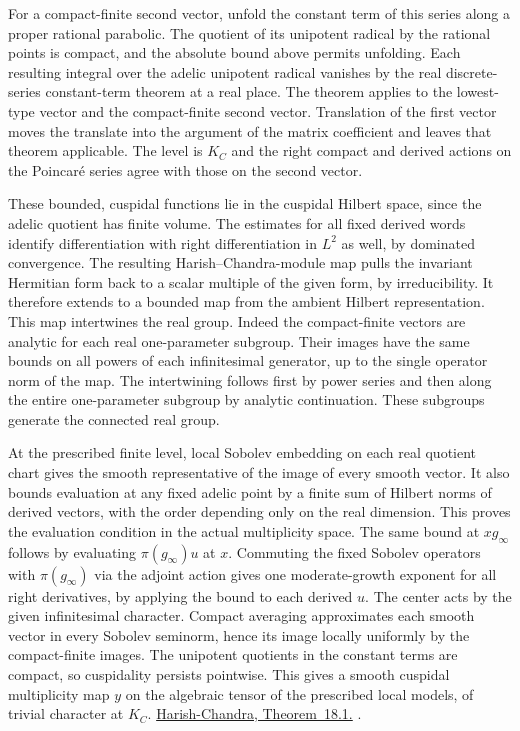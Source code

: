 For a compact-finite second vector, unfold the constant
term of this series along a proper rational parabolic.
The quotient of its unipotent radical by the rational points
is compact, and the absolute bound above permits unfolding.
Each resulting integral over the adelic unipotent radical
vanishes by the real discrete-series constant-term theorem
at a real place. The theorem applies to the lowest-type
vector and the compact-finite second vector. Translation of
the first vector moves the translate into the argument of
the matrix coefficient and leaves that theorem applicable.
The level is \(K_C\) and the right compact and derived
actions on the Poincar\'e series agree with those on the
second vector.

These bounded, cuspidal functions lie in the cuspidal Hilbert
space, since the adelic quotient has finite volume. The estimates
for all fixed derived words identify differentiation with right
differentiation in \(L^2\) as well, by dominated convergence.
The resulting Harish--Chandra-module map pulls the invariant
Hermitian form back to a scalar multiple of the given form, by
irreducibility. It therefore extends to a bounded map from the
ambient Hilbert representation. This map intertwines the real
group. Indeed the compact-finite vectors are analytic for each
real one-parameter subgroup. Their images have the same bounds
on all powers of each infinitesimal generator, up to the single
operator norm of the map. The intertwining follows first by
power series and then along the entire one-parameter subgroup
by analytic continuation. These subgroups generate the connected
real group.

At the prescribed finite level, local Sobolev embedding on
each real quotient chart gives the smooth representative of the
image of every smooth vector. It also bounds evaluation at any
fixed adelic point by a finite sum of Hilbert norms of derived
vectors, with the order depending only on the real dimension.
This proves the evaluation condition in the actual multiplicity
space. The same bound at \(xg_\infty\) follows by evaluating
\(\pi(g_\infty)u\) at \(x\). Commuting the fixed Sobolev
operators with \(\pi(g_\infty)\) via the adjoint action gives
one moderate-growth exponent for all right derivatives, by
applying the bound to each derived \(u\). The center acts by
the given infinitesimal character. Compact averaging approximates
each smooth vector in every Sobolev seminorm, hence its image
locally uniformly by the compact-finite images. The unipotent
quotients in the constant terms are compact, so cuspidality
persists pointwise. This gives a smooth cuspidal multiplicity
map \(y\) on the algebraic tensor of the prescribed local
models, of trivial character at \(K_C\).
\href{https://www.sciencedirect.com/science/article/pii/0022123675900348}{Harish-Chandra, Theorem~18.1.}
.

